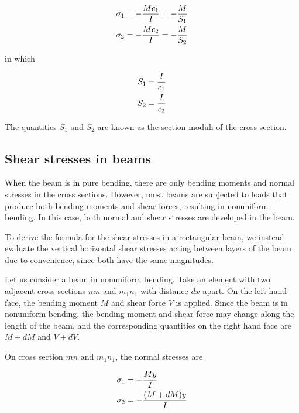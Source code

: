 \documentclass[a4paper,openany,12pt]{book}
\begin{document}
\begin{gather}
\label{eqn: section modulus}
  \sigma _1 =  - \frac{Mc_1}{I} =  - \frac{M}{S_1} \hfill \\
  \sigma _2 =  - \frac{Mc_2}{I} =  - \frac{M}{S_2} \hfill \\ 
\end{gather}

in which

$$\begin{gathered}
  S_1 = \frac{I}{c_1} \hfill \\
  S_2 = \frac{I}{c_2} \hfill \\ 
\end{gathered}$$

The quantities \(S_1\) and \(S_2\) are known as the section moduli of the
cross section.

\subsection{Shear stresses in beams}
\label{shear-stresses-in-beams}
When the beam is in pure bending, there are only bending moments and
normal stresses in the cross sections. However, most beams are subjected
to loads that produce both bending moments and shear forces, resulting
in nonuniform bending. In this case, both normal and shear stresses are
developed in the beam.

To derive the formula for the shear stresses in a rectangular beam, we
instead evaluate the vertical horizontal shear stresses acting between
layers of the beam due to convenience, since both have the same
magnitudes.

Let us consider a beam in nonuniform bending. Take an element with two
adjacent cross sections \(mn\) and \(m_1n_1\) with distance \(dx\) apart. On
the left hand face, the bending moment \(M\) and shear force \(V\) is
applied. Since the beam is in nonuniform bending, the bending moment and
shear force may change along the length of the beam, and the
corresponding quantities on the right hand face are \(M + dM\) and
\(V + dV\).


On cross section \(mn\) and \(m_1n_1\), the normal stresses are

$$\begin{gathered}
  \sigma _1 =  - \frac{My}{I} \hfill \\
  \sigma _2 =  - \frac{(M + dM)y}{I} \hfill \\ 
\end{gathered}$$
\end{document}
